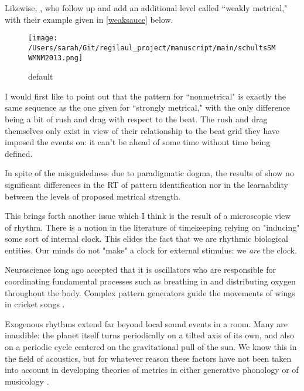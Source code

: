 Likewise, \citep{katsuyuki1999}, who follow up \citep{essensPovel1985} and add an additional level called ``weakly metrical," with their example given in \ref{weaksauce} below. 

\begin{figure}[htbp]
\begin{center}
\texttt{[image: /Users/sarah/Git/regilaul\_project/manuscript/main/schultsSMWMNM2013.png]}
\caption{default}
\label{default}
\end{center}
\end{figure}

I would first like to point out that the pattern for ``nonmetrical" is exactly the same sequence as the one given for ``strongly metrical," with the only difference being a bit of rush and drag with respect to the beat. The rush and drag themselves only exist in view of their relationship to the beat grid they have imposed the events on: it can't be ahead of some time without time being defined. 

In spite of the misguidedness due to paradigmatic dogma, the results of \citep{katsuyuki1999} show no significant differences in the RT of pattern identification nor in the learnability between the levels of proposed metrical strength. 




This brings forth another issue which I think is the result of a microscopic view of rhythm. There is a notion in the literature of timekeeping relying on "inducing" some sort of internal clock. This elides the fact that we are rhythmic biological entities. Our minds do not "make" a clock for external stimulus: we {\it are} the clock. 


Neuroscience long ago accepted that it is oscillators who are responsible for coordinating fundamental processes such as breathing in and distributing oxygen throughout the body. Complex pattern generators guide the movements of wings in cricket songs \citep{buzsaki2006}. 


Exogenous rhythms extend far beyond local sound events in a room. Many are inaudible: the planet itself turns periodically on a tilted axis of its own, and also on a periodic cycle centered on the gravitational pull of the sun. We know this in the field of acoustics, but for whatever reason these factors have not been taken into account in developing theories of metrics in either generative phonology or of musicology \citep{berger2011}. 


